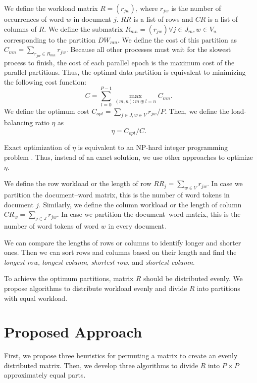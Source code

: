 \documentclass[10pt,conference]{IEEEtran}
\begin{document}
We define the workload matrix $R = (r_{jw})$, where $r_{jw}$ is the number of occurrences of word $w$ in document $j$. $RR$ is a list of rows and $CR$ is a list of columns of $R$. We define the submatrix $R_{mn} = (r_{jw}) \forall j \in J_m, w \in V_n$ corresponding to the partition $DW_{mn}$. We define the cost of this partition as $C_{mn} = \sum_{r_{jw} \in R_{mn}} r_{jw}$. Because all other processes must wait for the slowest process to finish, the cost of each parallel epoch is the maximum cost of the parallel partitions. Thus, the optimal data partition is equivalent to minimizing the following cost function:
\begin{equation}
C = \sum_{l = 0}^{P - 1} \max_{(m,n):m \oplus l = n}{C_{mn}}.
\end{equation}
We define the optimum cost $C_{opt} = \sum_{j \in J, w \in V} r_{jw}/P$. Then, we define the load-balancing ratio $\eta$ as 
\begin{equation}
\eta = C_{opt} / C.
\end{equation}

Exact optimization of $\eta$ is equivalent to an NP-hard integer programming problem \cite{boyd2004convex}. Thus, instead of an exact solution, we use other approaches to optimize $\eta$.

We define the row workload or the length of row $RR_j = \sum_{w \in V}{r_{jw}}$. In case we partition the document--word matrix, this is the number of word tokens in document $j$. Similarly, we define the column workload or the length of column $CR_w = \sum_{j \in J}{r_{jw}}$. In case we partition the document--word matrix, this is the number of word tokens of word $w$ in every document.

We can compare the lengths of rows or columns to identify longer and shorter ones. Then we can sort rows and columns based on their length and find the \textit{longest row}, \textit{longest column}, \textit{shortest row}, and \textit{shortest column}.

To achieve the optimum partitions, matrix $R$ should be distributed evenly. We propose algorithms to distribute workload evenly and divide $R$ into partitions with equal workload.

\section{Proposed Approach}
First, we propose three heuristics for permuting a matrix to create an evenly distributed matrix. Then, we develop three algorithms to divide $R$ into $P \times P$ approximately equal parts.
\end{document}
